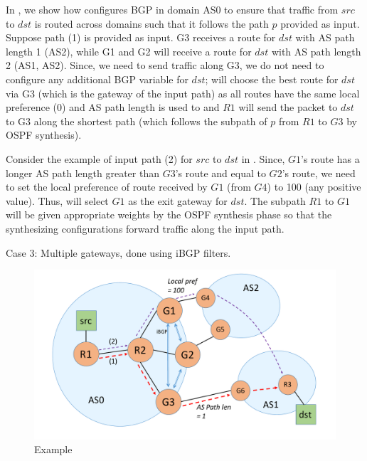 In , we show how \name configures BGP in domain AS0 
to ensure that traffic from $src$ to $dst$ is routed across domains 
such that it follows the path $p$ provided as input. Suppose path (1) is
provided as input. G3 receives a route for $dst$ with AS path length 1
(AS2), while G1 and G2 will receive a route for $dst$ with 
AS path length 2 (AS1, AS2). Since, we need to send traffic along
G3, we do not need to configure any additional BGP variable for $dst$;
 will choose the best route for $dst$ 
via G3 (which is the gateway of the input path) as all routes have
the same local preference (0) and AS path length is used to  and $R1$ will
send the packet to $dst$ to G3 along the shortest path (which 
follows the subpath of $p$ from $R1$ to $G3$ by OSPF synthesis). 

Consider the example of input path (2) for $src$ to $dst$ 
in . Since, $G1$'s route has a longer AS 
path length greater than $G3$'s route and equal to $G2$'s route,
we need to set the local preference of route received by $G1$ 
(from $G4$) to 100 (any positive value). Thus,  
will select $G1$ as the exit gateway for $dst$. The subpath
$R1$ to $G1$ will be given appropriate weights by the OSPF
synthesis phase so that the synthesizing configurations 
forward traffic along the input path. 

Case 3: Multiple gateways, done using iBGP filters. 
\begin{figure}[!t] 
	\centering
	\includegraphics[width=\columnwidth]{figures/bgp-example.pdf}
	\caption{Example} \label{fig:bgpeg}
\end{figure}

